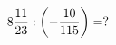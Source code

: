 \documentclass[preview]{standalone}
\begin{document}
\begin{align*}
8 { 11 \over 23 }  :  \left( - { 10 \over 115 } \right) = ?
\end{align*}
\end{document}
